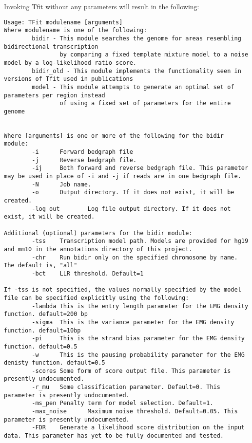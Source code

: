 \documentclass[12pt,letterpaper]{article}
\begin{document}
Invoking Tfit without any parameters will result in the following:
\begin{lstlisting}
Usage: TFit modulename [arguments]
Where modulename is one of the following:
        bidir - This module searches the genome for areas resembling bidirectional transcription
                by comparing a fixed template mixture model to a noise model by a log-likelihood ratio score.
        bidir_old - This module implements the functionality seen in versions of Tfit used in publications
        model - This module attempts to generate an optimal set of parameters per region instead 
                of using a fixed set of parameters for the entire genome


Where [arguments] is one or more of the following for the bidir module:
        -i      Forward bedgraph file
        -j      Reverse bedgraph file.
        -ij     Both forward and reverse bedgraph file. This parameter may be used in place of -i and -j if reads are in one bedgraph file.
        -N      Job name.
        -o      Output directory. If it does not exist, it will be created.
        -log_out        Log file output directory. If it does not exist, it will be created.

Additional (optional) parameters for the bidir module:
        -tss    Transcription model path. Models are provided for hg19 and mm10 in the annotations directory of this project.
        -chr    Run bidir only on the specified chromosome by name. The default is, "all"
        -bct    LLR threshold. Default=1

If -tss is not specified, the values normally specified by the model file can be specified explicitly using the following:
        -lambda This is the entry length parameter for the EMG density function. default=200 bp
        -sigma  This is the variance parameter for the EMG density function. default=10bp
        -pi     This is the strand bias parameter for the EMG density function. default=0.5
        -w      This is the pausing probability parameter for the EMG denisty function. default=0.5
        -scores Some form of score output file. This parameter is presently undocumented.
        -r_mu   Some classification parameter. Default=0. This parameter is presently undocumented.
        -ms_pen Penalty term for model selection. Default=1.
        -max_noise      Maximum noise threshold. Default=0.05. This parameter is presently undocumented.
        -FDR    Generate a likelihood score distribution on the input data. This parameter has yet to be fully documented and tested.



\end{lstlisting}
\end{document}
